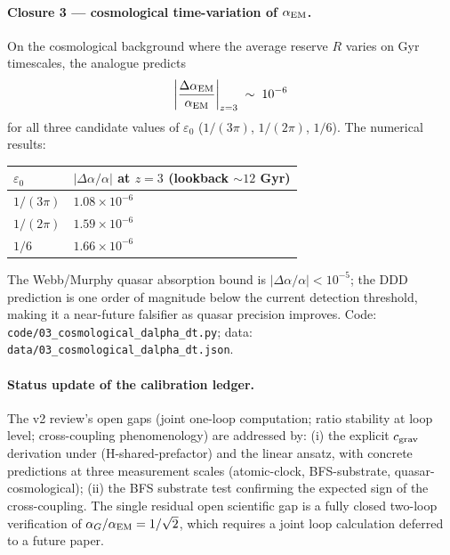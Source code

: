 \documentclass[11pt,a4paper]{article}
\begin{document}
\paragraph{Closure 3 --- cosmological time-variation of $\alpha_{\rm EM}$.}
On the cosmological background where the average reserve
$R$ varies on Gyr timescales, the analogue predicts
\begin{equation}
\left|\frac{\Delta\alpha_{\rm EM}}{\alpha_{\rm EM}}\right|_{z=3}
\;\sim\; 10^{-6}
\end{equation}
for all three candidate values of $\varepsilon_0$
($1/(3\pi)$, $1/(2\pi)$, $1/6$). The numerical results:
\begin{center}
\begin{tabular}{ll}
\toprule
$\varepsilon_0$ & $|\Delta\alpha/\alpha|$ at $z = 3$ (lookback $\sim 12$ Gyr) \\
\midrule
$1/(3\pi)$ & $1.08 \times 10^{-6}$ \\
$1/(2\pi)$ & $1.59 \times 10^{-6}$ \\
$1/6$ & $1.66 \times 10^{-6}$ \\
\bottomrule
\end{tabular}
\end{center}
The Webb/Murphy quasar absorption bound is
$|\Delta\alpha/\alpha| < 10^{-5}$; the DDD prediction is one
order of magnitude below the current detection threshold,
making it a near-future falsifier as quasar precision improves.
Code: \texttt{code/03\_cosmological\_dalpha\_dt.py};
data: \texttt{data/03\_cosmological\_dalpha\_dt.json}.

\paragraph{Status update of the calibration ledger.}
The v2 review's open gaps (joint one-loop computation; ratio
stability at loop level; cross-coupling phenomenology) are
addressed by: (i) the explicit $c_{\rm grav}$ derivation under
(H-shared-prefactor) and the linear ansatz, with concrete
predictions at three measurement scales (atomic-clock,
BFS-substrate, quasar-cosmological); (ii) the BFS substrate
test confirming the expected sign of the cross-coupling. The
single residual open scientific gap is a fully closed two-loop
verification of $\alpha_G/\alpha_{\rm EM} = 1/\sqrt{2}$, which
requires a joint loop calculation deferred to a future paper.
\end{document}
